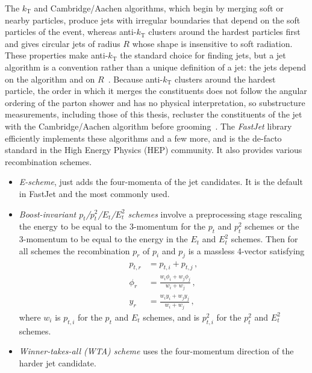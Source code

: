%
The \(k_\mathrm{T}\) and Cambridge/Aachen algorithms, which begin by merging soft or nearby particles, produce jets with irregular boundaries that depend on the soft particles of the event, whereas anti-\(k_\mathrm{T}\) clusters around the hardest particles first and gives circular jets of radius \(R\) whose shape is insensitive to soft radiation.  
%
These properties make anti-\(k_\mathrm{T}\) the standard choice for finding jets, but a jet algorithm is a convention rather than a unique definition of a jet: the jets depend on the algorithm and on \(R\)~\cite{Salam:2009jx}.
%
Because anti-\(k_\mathrm{T}\) clusters around the hardest particle, the order in which it merges the constituents does not follow the angular ordering of the parton shower and has no physical interpretation, so substructure measurements, including those of this thesis, recluster the constituents of the jet with the Cambridge/Aachen algorithm before grooming~\cite{Dasgupta_2013}.
%
The \emph{FastJet} library~\cite{Cacciari:2011ma} efficiently implements these algorithms and a few more, and is the de-facto standard in the High Energy Physics (HEP) community. 
%
It also provides various recombination schemes. 
\begin{itemize}
	\item \emph{E-scheme}, just adds the four-momenta of the jet candidates. It is the default in FastJet and the most commonly used.
	\item \emph{Boost-invariant $p_t$/$p_t^2$/$E_t$/$E_t^2$ schemes} involve a preprocessing stage rescaling the energy to be equal to the 3-momentum for the
	$p_t$ and $p_t^2$ schemes or the 3-momentum to be equal to
	the energy in the $E_t$ and $E_t^2$ schemes. Then for all schemes the
	recombination $p_r$ of $p_i$ and $p_j$ is a massless 4-vector
	satisfying
	\begin{subequations}
		\begin{align}
			p_{t,r} &= p_{t,i} + p_{t,j}\,,\\
			\phi_r &= \frac{w_i \phi_i + w_j \phi_j}{w_i + w_j}\,,\\
			y_r &= \frac{w_i y_i + w_j y_j}{w_i + w_j}\,,
		\end{align}
	\end{subequations}
	where $w_i$ is $p_{t,i}$ for the $p_t$ and $E_t$ schemes, and is
	$p_{t,i}^2$ for the $p_t^2$ and $E_t^2$ schemes. 
	\item \emph{Winner-takes-all (WTA) scheme} uses the four-momentum direction of the harder jet candidate.
\end{itemize}

